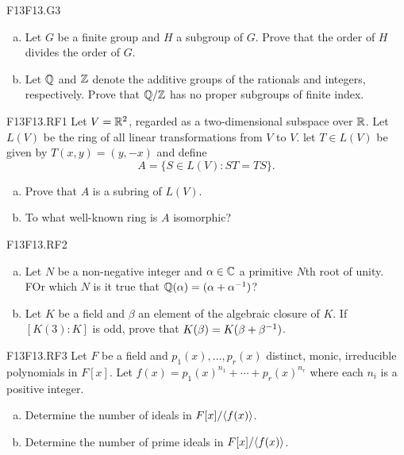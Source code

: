 \documentclass[../AlgebraQualSolutions.tex]{subfiles}
\begin{document}
	\begin{prob}{F13}{F13.G3}

		\begin{enumerate}[(a)]
			\item Let $G$ be a finite group and $H$ a subgroup of $G$. Prove that the order of $H$ divides the order of $G$.
			\item  Let $\mathbb{Q}$ and $\mathbb{Z}$ denote the additive groups of the rationals and integers, respectively. Prove that $\mathbb{Q}/\mathbb{Z}$ has no proper subgroups of finite index.
		\end{enumerate}
	\end{prob}

	\begin{prob}{F13}{F13.RF1}
		Let $V = \mathbb{R}^2$, regarded as a two-dimensional subspace over $\mathbb{R}$. Let $L(V)$ be the ring of all linear transformations from $V$ to $V$. let $T \in L(V)$ be given by $T(x,y) = (y,-x)$ and define 
			\[A = \{S \in L(V): ST = TS\}. \]
		\begin{enumerate}[(a)]
			\item Prove that $A$ is a subring of $L(V)$.
			\item To what well-known ring is $A$ isomorphic?
		\end{enumerate}
	\end{prob}

	\begin{prob}{F13}{F13.RF2}

		\begin{enumerate}[(a)]
			\item Let $N$ be a non-negative integer and $\alpha \in \mathbb{C}$ a primitive $N$th root of unity. FOr which $N$ is it true that $\mathbb{Q}(\alpha) = (\alpha + \alpha^{-1})$?
			\item Let $K$ be a field and $\beta$ an element of the algebraic closure of $K$. If $[K(3):K]$ is odd, prove that $K(\beta) = K(\beta + \beta^{-1})$.
		\end{enumerate}
	\end{prob}

	\begin{prob}{F13}{F13.RF3}
		Let $F$ be a field and $p_1(x), \ldots, p_r(x)$ distinct, monic, irreducible polynomials in $F[x]$. Let $f(x) = p_1(x)^{n_1} + \cdots + p_r(x)^{n_r}$ where each $n_i$ is a positive integer.

		\begin{enumerate}[(a)]
			\item Determine the number of ideals in $F[x]/\langle f(x) \rangle$.
			\item Determine the number of prime ideals in $F[x]/\langle f(x) \rangle$.
		\end{enumerate}
	\end{prob}
\end{document}
